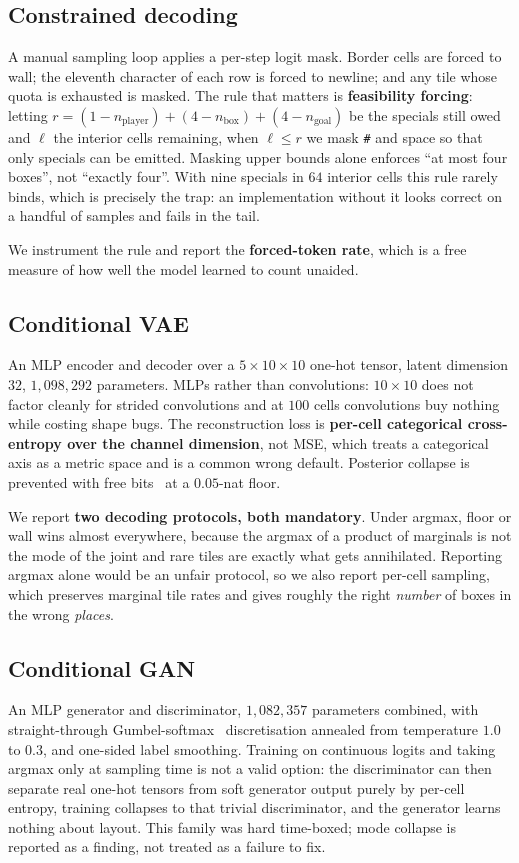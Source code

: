 \documentclass[conference]{IEEEtran}
\begin{document}
\subsection{Constrained decoding}
\label{sec:constrained}
A manual sampling loop applies a per-step logit mask. Border cells are forced to
wall; the eleventh character of each row is forced to newline; and any tile whose
quota is exhausted is masked. The rule that matters is \textbf{feasibility
forcing}: letting $r=(1-n_{\text{player}})+(4-n_{\text{box}})+(4-n_{\text{goal}})$
be the specials still owed and $\ell$ the interior cells remaining, when
$\ell \leq r$ we mask \texttt{\#} and space so that only specials can be emitted.
Masking upper bounds alone enforces ``at most four boxes'', not ``exactly four''.
With nine specials in $64$ interior cells this rule rarely binds, which is
precisely the trap: an implementation without it looks correct on a handful of
samples and fails in the tail.

We instrument the rule and report the \textbf{forced-token rate}, which is a free
measure of how well the model learned to count unaided.

\subsection{Conditional VAE}
An MLP encoder and decoder over a $5\times10\times10$ one-hot tensor, latent
dimension $32$, $1{,}098{,}292$ parameters. MLPs rather than convolutions:
$10\times10$ does not factor cleanly for strided convolutions and at $100$ cells
convolutions buy nothing while costing shape bugs. The reconstruction loss is
\textbf{per-cell categorical cross-entropy over the channel dimension}, not MSE,
which treats a categorical axis as a metric space and is a common wrong default.
Posterior collapse is prevented with free bits~\cite{kingma2016freebits} at a
$0.05$-nat floor.

We report \textbf{two decoding protocols, both mandatory}. Under argmax, floor
or wall wins almost everywhere, because the argmax of a product of marginals is
not the mode of the joint and rare tiles are exactly what gets annihilated.
Reporting argmax alone would be an unfair protocol, so we also report per-cell
sampling, which preserves marginal tile rates and gives roughly the right
\emph{number} of boxes in the wrong \emph{places}.

\subsection{Conditional GAN}
An MLP generator and discriminator, $1{,}082{,}357$ parameters combined, with
straight-through Gumbel-softmax~\cite{jang2017gumbel} discretisation annealed
from temperature $1.0$ to $0.3$, and one-sided label smoothing. Training on
continuous logits and taking argmax only at sampling time is not a valid option:
the discriminator can then separate real one-hot tensors from soft generator
output purely by per-cell entropy, training collapses to that trivial
discriminator, and the generator learns nothing about layout. This family was
hard time-boxed; mode collapse is reported as a finding, not treated as a
failure to fix.
\end{document}

